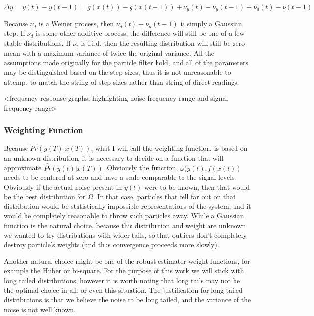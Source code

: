 \documentclass{article}
\begin{document}
\begin{equation}
\label{measass}
\Delta y = y(t) - y(t-1) = g(x(t)) - g(x(t-1)) + \nu_y(t) - \nu_y(t-1) + \nu_d(t) - \nu(t-1)
\end{equation}

Because $\nu_d$ is a Weiner process, then $\nu_d(t) - \nu_d(t-1)$ is simply a Gaussian step. If
$\nu_d$ is some other additive process, the difference will still be one of a few stable
distributions. If $\nu_y$ is i.i.d. then the resulting distribution will still be zero mean
with a maximum variance of twice the original variance. All the assumptions made originally
for the particle filter hold, and all of the parameters may be distinguished based on
the step sizes, thus it is not unreasonable to attempt to match the string of step sizes
rather than string of direct readings. 

<frequency response graphs, highlighting noise frequency range and signal frequency range>

\subsubsection{Weighting Function}
Because $\hat{Pr}(y(T) | x(T))$, what I will call the weighting function,
is based on an unknown distribution, it is necessary to decide on a function
that will approximate $\hat{Pr}(y(t) | x(T))$. Obviously the function, $\omega(y(t), f(x(t))$
needs to be centered at zero and have a scale comparable to the signal levels.
Obviously if the actual noise present in $y(t)$ were to be known, then that would
be the best distribution for $\Omega$. In that case, particles that fell
far out on that distribution would be statistically impossible representations
of the system, and it would be completely reasonable to throw such particles away.
While a Gaussian function is the natural choice, because this distribution
and weight are unknown we wanted to try distributions
with wider tails, so that outliers don't completely destroy particle's weights
(and thus convergence proceeds more slowly).

Another natural choice might be one of the robust estimator weight functions, for
example the Huber or bi-square. For the purpose of this work we will stick
with long tailed distributions, however it is worth noting that long tails
may not be the optimal choice in all, or even this situation. The justification
for long tailed distributions is that we believe the noise to be long tailed,
and the variance of the noise is not well known.
\end{document}
